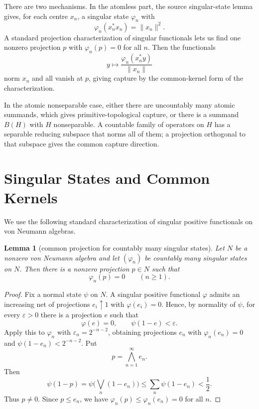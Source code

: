 \documentclass[11pt]{article}
\newtheorem{lemma}{Lemma}
\begin{document}
There are two mechanisms.  In the atomless part, the source singular-state
lemma gives, for each centre \(x_n\), a singular state \(\varphi_n\) with
\[
        \varphi_n(x_n^*x_n)=\|x_n\|^2.
\]
A standard projection characterization of singular functionals lets us find
one nonzero projection \(p\) with \(\varphi_n(p)=0\) for all \(n\).  Then the
functionals
\[
        y\mapsto \frac{\varphi_n(x_n^*y)}{\|x_n\|}
\]
norm \(x_n\) and all vanish at \(p\), giving capture by the common-kernel
form of the characterization.

In the atomic nonseparable case, either there are uncountably many atomic
summands, which gives primitive-topological capture, or there is a summand
\(B(H)\) with \(H\) nonseparable.  A countable family of operators on \(H\)
has a separable reducing subspace that norms all of them; a projection
orthogonal to that subspace gives the common capture direction.

\section*{Singular States and Common Kernels}

We use the following standard characterization of singular positive
functionals on von Neumann algebras.

\begin{lemma}[common projection for countably many singular states]
\label{lem:singular-common}
Let \(N\) be a nonzero von Neumann algebra and let
\((\varphi_n)\) be countably many singular states on \(N\).  Then there is a
nonzero projection \(p\in N\) such that
\[
        \varphi_n(p)=0\qquad(n\ge1).
\]
\end{lemma}

\begin{proof}
Fix a normal state \(\psi\) on \(N\).  A singular positive functional
\(\varphi\) admits an increasing net of projections \(e_i\uparrow 1\) with
\(\varphi(e_i)=0\).  Hence, by normality of \(\psi\), for every
\(\varepsilon>0\) there is a projection \(e\) such that
\[
        \varphi(e)=0,\qquad \psi(1-e)<\varepsilon.
\]
Apply this to \(\varphi_n\) with \(\varepsilon_n=2^{-n-2}\), obtaining
projections \(e_n\) with \(\varphi_n(e_n)=0\) and
\(\psi(1-e_n)<2^{-n-2}\).  Put
\[
        p=\bigwedge_{n=1}^\infty e_n.
\]
Then
\[
        \psi(1-p)
        =
        \psi\Big(\bigvee_n(1-e_n)\Big)
        \le
        \sum_n\psi(1-e_n)
        <
        \frac12.
\]
Thus \(p\ne0\).  Since \(p\le e_n\), we have
\(\varphi_n(p)\le\varphi_n(e_n)=0\) for all \(n\).
\end{proof}
\end{document}
